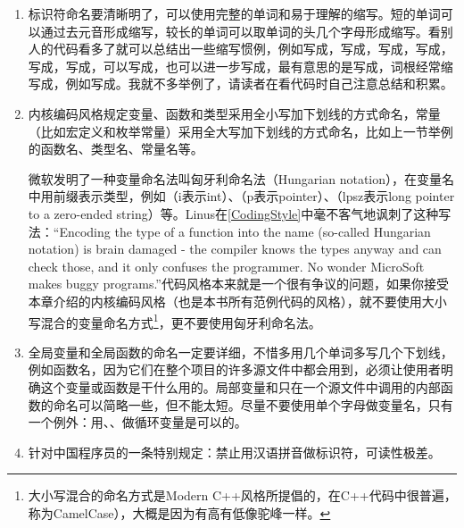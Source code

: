 \begin{enumerate}

\item 标识符命名要清晰明了，可以使用完整的单词和易于理解的缩写。短的单词可以通过去元音形成缩写，较长的单词可以取单词的头几个字母形成缩写。看别人的代码看多了就可以总结出一些缩写惯例，例如写成，写成，写成，写成，写成，写成，可以写成，也可以进一步写成，最有意思的是写成，词根经常缩写成，例如写成。我就不多举例了，请读者在看代码时自己注意总结和积累。

\item 内核编码风格规定变量、函数和类型采用全小写加下划线的方式命名，常量（比如宏定义和枚举常量）采用全大写加下划线的方式命名，比如上一节举例的函数名、类型名、常量名等。



微软发明了一种变量命名法叫匈牙利命名法（Hungarian notation），在变量名中用前缀表示类型，例如（i表示int）、（p表示pointer）、（lpsz表示long pointer to a zero-ended string）等。Linus在\hyperlink{db.bi01.bibli.codingstyle}{[CodingStyle]}中毫不客气地讽刺了这种写法：“Encoding the type of a function into the name (so-called Hungarian notation) is brain damaged - the compiler knows the types anyway and can check those, and it only confuses the programmer.\BookSplit{} No wonder MicroSoft makes buggy programs.\BookSplit{}”代码风格本来就是一个很有争议的问题，如果你接受本章介绍的内核编码风格（也是本书所有范例代码的风格），就不要使用大小写混合的变量命名方式\footnote[19]{大小写混合的命名方式是Modern C++风格所提倡的，在C++代码中很普遍，称为CamelCase），大概是因为有高有低像驼峰一样。}，更不要使用匈牙利命名法。

\item 全局变量和全局函数的命名一定要详细，不惜多用几个单词多写几个下划线，例如函数名，因为它们在整个项目的许多源文件中都会用到，必须让使用者明确这个变量或函数是干什么用的。局部变量和只在一个源文件中调用的内部函数的命名可以简略一些，但不能太短。尽量不要使用单个字母做变量名，只有一个例外：用、、做循环变量是可以的。

\item 针对中国程序员的一条特别规定：禁止用汉语拼音做标识符，可读性极差。
\end{enumerate}

